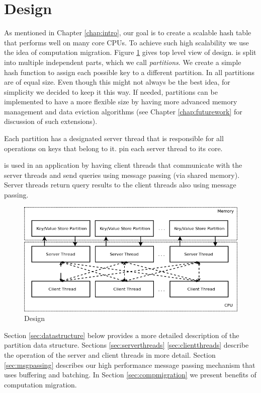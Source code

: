 \section{\cphash{} Design}
\label{chap:mcstore}

As mentioned in Chapter \ref{chap:intro}, our goal is to create a scalable hash table 
that performs well on many core CPUs. To achieve such high scalability we use the idea of 
computation migration. Figure \ref{fig:mcstore} gives top level view of \cphash{} design. 
\cphash{} is split into multiple independent parts, which we call \textit{partitions}. We create a simple 
hash function to assign each possible key to a different partition. In \cphash{} all partitions are of equal size. Even though 
this might not always be the best idea, for simplicity we decided to keep it this way. 
If needed, partitions can be implemented to have a more flexible size by having more advanced 
memory management and data eviction algorithms (see Chapter \ref{chap:futurework} for discussion of such extensions).

Each partition has a designated server thread that is responsible for all operations 
on keys that belong to it. \cphash{} pin each server thread to its core.

\cphash{} is used in an application by having client threads that communicate with the server threads
and send queries using message passing (via shared memory). Server threads return query results
to the client threads also using message passing.  

\begin{figure}[!ht]
  \centering
  \includegraphics[width=0.8\linewidth]{figs/mcstore.png}
  \caption{\cphash{} Design}
  \label{fig:mcstore}
\end{figure}

  
Section \ref{sec:datastructure} below provides a more detailed description of the partition data structure. 
Sections \ref{sec:serverthreads} \ref{sec:clientthreads} describe the operation of the server and client threads in more detail. 
Section \ref{sec:msgpassing} describes our high performance message passing mechanism that uses buffering and batching. 
In Section \ref{sec:compmigration} we present benefits of computation migration. 

